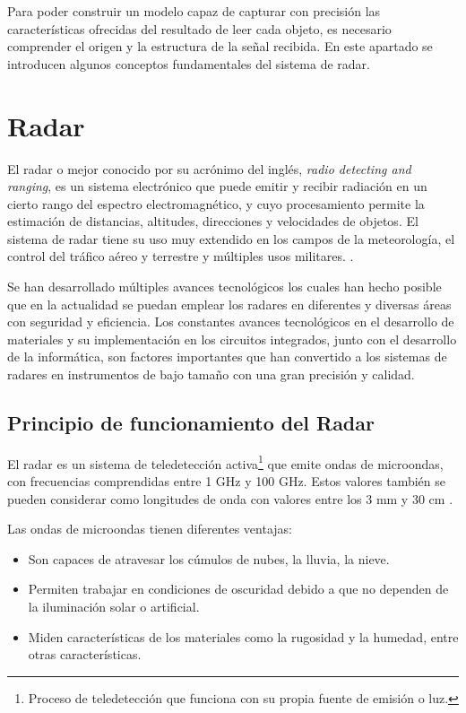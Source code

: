 
Para poder construir un modelo capaz de capturar con precisión las características ofrecidas del resultado de leer cada objeto, es necesario comprender el origen y la estructura de la señal recibida. En este apartado se introducen algunos conceptos fundamentales del sistema de radar.

\section{Radar}

El radar o mejor conocido por su acrónimo del inglés, \textit{radio detecting and ranging}, es un sistema electrónico que puede emitir y recibir radiación en un cierto rango del espectro electromagnético, y cuyo procesamiento permite la estimación de distancias, altitudes, direcciones y velocidades de objetos. El sistema de radar tiene su uso muy extendido en los campos de la meteorología, el control del tráfico aéreo y terrestre y múltiples usos militares. \cite{AlonsoCerpa}.

Se han desarrollado múltiples avances tecnológicos los cuales han hecho posible que en la actualidad se puedan emplear los radares en diferentes y diversas áreas con seguridad y eficiencia. Los constantes avances tecnológicos en el desarrollo de materiales y su implementación en los circuitos integrados, junto con el desarrollo de la informática, son factores importantes que han convertido a los sistemas de radares en instrumentos de bajo tamaño con una gran precisión y calidad. 

\subsection{Principio de funcionamiento del Radar}

El radar es un sistema de teledetección activa\footnote{Proceso de teledetección que funciona con su propia fuente de emisión o luz.} que emite ondas de microondas, con frecuencias comprendidas entre 1 GHz y 100 GHz. Estos valores también se pueden considerar como longitudes de onda con valores entre los 3 mm y 30 cm \cite{HerreraG2009}. 

Las ondas de microondas tienen diferentes ventajas:
\begin{itemize}
\item Son capaces de atravesar los cúmulos de nubes, la lluvia, la nieve.
\item Permiten trabajar en condiciones de oscuridad debido a que no dependen de la iluminación solar o artificial.
\item Miden características de los materiales como la rugosidad y la humedad, entre otras características.
\end{itemize} 

